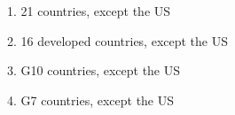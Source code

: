 \small



1. 21 countries, except the US


2. 16 developed countries, except the US


3. G10 countries, except the US


4. G7 countries, except the US





